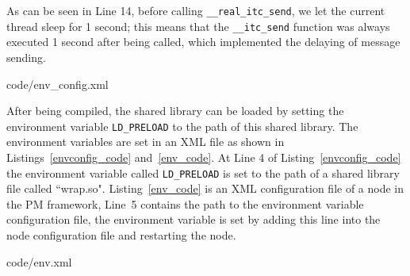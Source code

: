 As can be seen in Line 14,
before calling \texttt{\_\_real\_itc\_send}, we let the current thread sleep for 1 second; %
this means that the \texttt{\_\_itc\_send} function was always executed 1 second after being called, which implemented the delaying of message sending.

\begin{minipage}{.96\columnwidth}

{code/env_config.xml}
\end{minipage}

After being compiled, the shared library can be loaded by setting the environment variable \texttt{LD\_PRELOAD} to the path of this shared library. %
The environment variables are set in an XML file as shown in Listings~\ref{envconfig_code} and~\ref{env_code}. At Line 4 of Listing~\ref{envconfig_code} the environment variable called \texttt{LD\_PRELOAD} is set to the path of a shared library file called ``wrap.so". Listing~\ref{env_code} is an XML configuration file of a node in the PM framework, Line~5 contains the path to the environment variable configuration file, the environment variable is set by adding this line into the node configuration file and restarting the node.



\begin{minipage}{.96\columnwidth}

{code/env.xml}
\end{minipage}